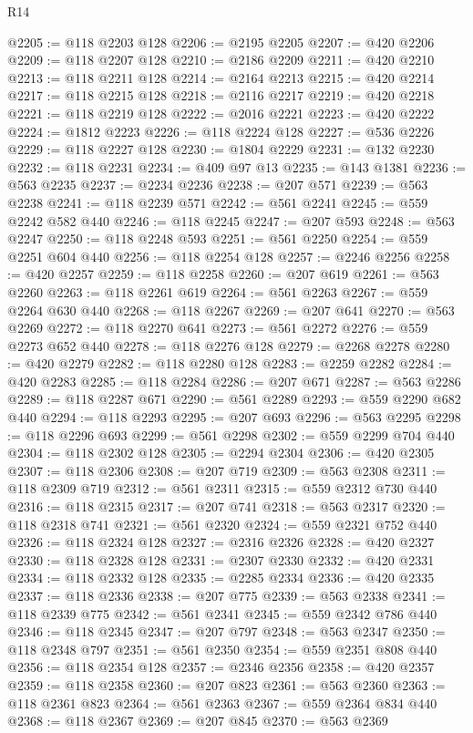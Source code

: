 \begin{lexlean}{R14}
\begin{coremodule}
{{{{{{{{{{{{{{{{{{{{{{{{{{{{{{{{{{{{{{{{{{{{{{{{{{{{{{{{{{{{{{{{{{{{{{{{{{{{{{{{{{@2205 := @118 @2203 @128
@2206 := @2195 @2205
@2207 := @420 @2206
@2209 := @118 @2207 @128
@2210 := @2186 @2209
@2211 := @420 @2210
@2213 := @118 @2211 @128
@2214 := @2164 @2213
@2215 := @420 @2214
@2217 := @118 @2215 @128
@2218 := @2116 @2217
@2219 := @420 @2218
@2221 := @118 @2219 @128
@2222 := @2016 @2221
@2223 := @420 @2222
@2224 := @1812 @2223
@2226 := @118 @2224 @128
@2227 := @536 @2226
@2229 := @118 @2227 @128
@2230 := @1804 @2229
@2231 := @132 @2230
@2232 := @118 @2231
@2234 := @409 @97 @13
@2235 := @143 @1381
@2236 := @563 @2235
@2237 := @2234 @2236
@2238 := @207 @571
@2239 := @563 @2238
@2241 := @118 @2239 @571
@2242 := @561 @2241
@2245 := @559 @2242 @582 @440
@2246 := @118 @2245
@2247 := @207 @593
@2248 := @563 @2247
@2250 := @118 @2248 @593
@2251 := @561 @2250
@2254 := @559 @2251 @604 @440
@2256 := @118 @2254 @128
@2257 := @2246 @2256
@2258 := @420 @2257
@2259 := @118 @2258
@2260 := @207 @619
@2261 := @563 @2260
@2263 := @118 @2261 @619
@2264 := @561 @2263
@2267 := @559 @2264 @630 @440
@2268 := @118 @2267
@2269 := @207 @641
@2270 := @563 @2269
@2272 := @118 @2270 @641
@2273 := @561 @2272
@2276 := @559 @2273 @652 @440
@2278 := @118 @2276 @128
@2279 := @2268 @2278
@2280 := @420 @2279
@2282 := @118 @2280 @128
@2283 := @2259 @2282
@2284 := @420 @2283
@2285 := @118 @2284
@2286 := @207 @671
@2287 := @563 @2286
@2289 := @118 @2287 @671
@2290 := @561 @2289
@2293 := @559 @2290 @682 @440
@2294 := @118 @2293
@2295 := @207 @693
@2296 := @563 @2295
@2298 := @118 @2296 @693
@2299 := @561 @2298
@2302 := @559 @2299 @704 @440
@2304 := @118 @2302 @128
@2305 := @2294 @2304
@2306 := @420 @2305
@2307 := @118 @2306
@2308 := @207 @719
@2309 := @563 @2308
@2311 := @118 @2309 @719
@2312 := @561 @2311
@2315 := @559 @2312 @730 @440
@2316 := @118 @2315
@2317 := @207 @741
@2318 := @563 @2317
@2320 := @118 @2318 @741
@2321 := @561 @2320
@2324 := @559 @2321 @752 @440
@2326 := @118 @2324 @128
@2327 := @2316 @2326
@2328 := @420 @2327
@2330 := @118 @2328 @128
@2331 := @2307 @2330
@2332 := @420 @2331
@2334 := @118 @2332 @128
@2335 := @2285 @2334
@2336 := @420 @2335
@2337 := @118 @2336
@2338 := @207 @775
@2339 := @563 @2338
@2341 := @118 @2339 @775
@2342 := @561 @2341
@2345 := @559 @2342 @786 @440
@2346 := @118 @2345
@2347 := @207 @797
@2348 := @563 @2347
@2350 := @118 @2348 @797
@2351 := @561 @2350
@2354 := @559 @2351 @808 @440
@2356 := @118 @2354 @128
@2357 := @2346 @2356
@2358 := @420 @2357
@2359 := @118 @2358
@2360 := @207 @823
@2361 := @563 @2360
@2363 := @118 @2361 @823
@2364 := @561 @2363
@2367 := @559 @2364 @834 @440
@2368 := @118 @2367
@2369 := @207 @845
@2370 := @563 @2369
}}}}}}}}}}}}}}}}}}}}}}}}}}}}}}}}}}}}}}}}}}}}}}}}}}}}}}}}}}}}}}}}}}}}}}}}}}}}}}}}}}
\end{coremodule}
\end{lexlean}

